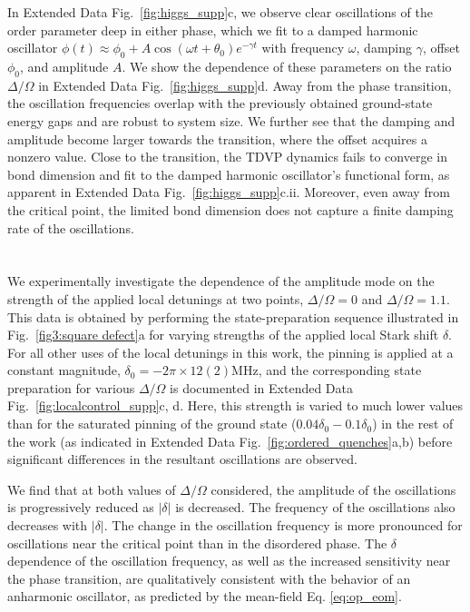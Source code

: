 \documentclass[reprint,twocolumn,secnumarabic,amssymb, aps, prx]{revtex4-2}
\begin{document}
In Extended Data Fig.~\ref{fig:higgs_supp}c, we observe clear oscillations of the order parameter deep in either phase, which we fit to a damped harmonic oscillator $\phi(t) \approx \phi_0+A \cos{(\omega t+\theta_0)}e^{-\gamma t}$ with frequency $\omega$, damping $\gamma$, offset $\phi_0$, and amplitude $A$. We show the dependence of these parameters on the ratio $\Delta/\Omega$ in Extended Data Fig.~\ref{fig:higgs_supp}d. Away from the phase transition, the oscillation frequencies overlap with the previously obtained ground-state energy gaps and are robust to system size. 
We further see that the damping and amplitude become larger towards the transition, where the offset acquires a nonzero value.
Close to the transition, the TDVP dynamics fails to converge in bond dimension and fit to the damped harmonic oscillator's functional form, as apparent in Extended Data Fig.~\ref{fig:higgs_supp}c.ii. Moreover, even away from the critical point, the limited bond dimension does not capture a finite damping rate of the oscillations.\\

 \\
\\
We experimentally investigate the dependence of the amplitude mode on the strength of the applied local detunings at two points, $\Delta/\Omega = 0$ and $\Delta/\Omega=1.1$. This data is obtained by performing the state-preparation sequence illustrated in Fig.~\ref{fig3:square defect}a for varying strengths of the applied local Stark shift $\delta$. For all other uses of the local detunings in this work, the pinning is applied at a constant magnitude, $\delta_0 = -2\pi\times12(2)$MHz, and the corresponding state preparation for various $\Delta/\Omega$ is documented in Extended Data Fig.~\ref{fig:localcontrol_supp}c, d. Here, this strength is varied to much lower values than for the saturated pinning of the ground state ($0.04\delta_0-0.1\delta_0$) in the rest of the work (as indicated in Extended Data Fig.~\ref{fig:ordered_quenches}a,b) before significant differences in the resultant oscillations are observed.

We find that at both values of $\Delta/\Omega$ considered, the amplitude of the oscillations is progressively reduced as $|\delta|$ is decreased. The frequency of the oscillations also decreases with $|\delta|$. The change in the oscillation frequency is more pronounced for oscillations near the critical point than in the disordered phase. The $\delta$ dependence of the oscillation frequency, as well as the increased sensitivity near the phase transition, are qualitatively consistent with the behavior of an anharmonic oscillator, as predicted by the mean-field Eq. \eqref{eq:op_eom}.\\
\end{document}
